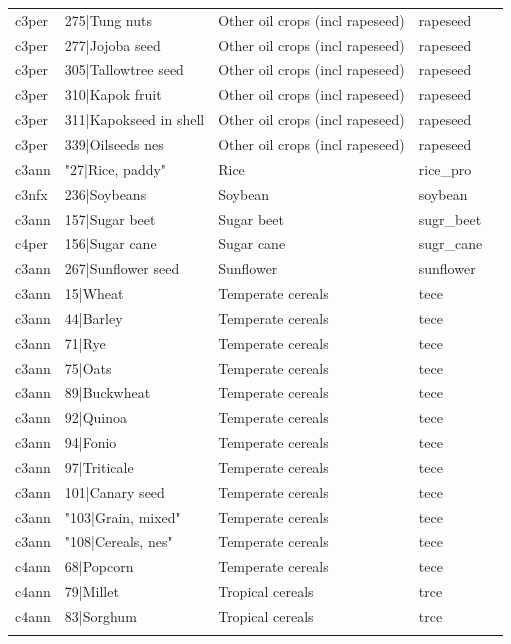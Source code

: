 \documentclass[gc, manuscript]{copernicus}
\begin{document}
\begin{table}[htbp]
\begin{tabular}{lllll}
      c3per & 275|Tung nuts & Other oil crops (incl rapeseed) & rapeseed \\ 
      c3per & 277|Jojoba seed & Other oil crops (incl rapeseed) & rapeseed \\ 
      c3per & 305|Tallowtree seed & Other oil crops (incl rapeseed) & rapeseed \\ 
      c3per & 310|Kapok fruit & Other oil crops (incl rapeseed) & rapeseed \\ 
      c3per & 311|Kapokseed in shell & Other oil crops (incl rapeseed) & rapeseed \\ 
      c3per & 339|Oilseeds nes & Other oil crops (incl rapeseed) & rapeseed \\ 
      c3ann & "27|Rice, paddy" & Rice & rice\_pro \\ 
      c3nfx & 236|Soybeans & Soybean & soybean \\ 
      c3ann & 157|Sugar beet & Sugar beet & sugr\_beet \\ 
      c4per & 156|Sugar cane & Sugar cane & sugr\_cane \\ 
      c3ann & 267|Sunflower seed & Sunflower & sunflower \\ 
      c3ann & 15|Wheat & Temperate cereals & tece \\ 
      c3ann & 44|Barley & Temperate cereals & tece \\ 
      c3ann & 71|Rye & Temperate cereals & tece \\ 
      c3ann & 75|Oats & Temperate cereals & tece \\ 
      c3ann & 89|Buckwheat & Temperate cereals & tece \\ 
      c3ann & 92|Quinoa & Temperate cereals & tece \\ 
      c3ann & 94|Fonio & Temperate cereals & tece \\ 
      c3ann & 97|Triticale & Temperate cereals & tece \\ 
      c3ann & 101|Canary seed & Temperate cereals & tece \\ 
      c3ann & "103|Grain, mixed" & Temperate cereals & tece \\ 
      c3ann & "108|Cereals, nes" & Temperate cereals & tece \\ 
      c4ann & 68|Popcorn & Temperate cereals & tece \\ 
      c4ann & 79|Millet & Tropical cereals & trce \\ 
      c4ann & 83|Sorghum & Tropical cereals & trce \\ 
      \bottomhline
  \end{tabular}
  \label{tab:fao2luh2mag}
\end{table}
\end{document}

